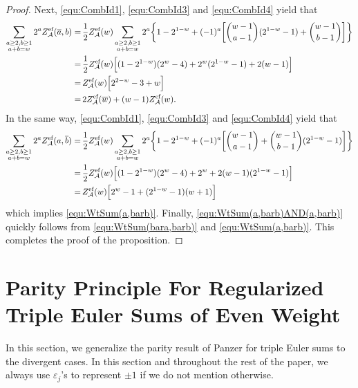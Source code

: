 \documentclass{article}
\newcommand\eps{{\varepsilon}}
\newcommand{\calA}{\mathcal{A}}
\newcommand{\eff}{\text{\rm{ef}}}
\newcommand{\ol}{\overline}
\theoremstyle{plain}
\theoremstyle{definition}
\begin{document}
\begin{proof}
Next,  \eqref{equ:CombId1}, \eqref{equ:CombId3} and  \eqref{equ:CombId4} yield that
\begin{align*}
  \sum_{\substack{a\ge 2,b\ge 1\\ a+b=w}} 2^a Z_\calA^\eff(\ol{a},b)
  =&\, \frac12 Z_\calA^\eff(w)\sum_{\substack{a\ge 2,b\ge 1\\ a+b=w}}   2^a \bigg\{1-2^{1-w}+(-1)^a \bigg[\binom{w-1}{a-1}(2^{1-w}-1)+\binom{w-1}{b-1}\bigg]\bigg\} \\
  =&\, \frac12 Z_\calA^\eff(w) \Big[(1-2^{1-w})(2^w-4)+2^w(2^{1-w}-1) +2(w-1)\Big]\\
  =&\,  Z_\calA^\eff(w) \Big[2^{2-w}-3+w\Big]\\
  =&\, 2Z_\calA^\eff(\ol{w}) + (w-1)Z_\calA^\eff(w).
\end{align*}
In the same way, \eqref{equ:CombId1}, \eqref{equ:CombId3} and  \eqref{equ:CombId4} yield that
\begin{align*}
  \sum_{\substack{a\ge 2,b\ge 1\\ a+b=w}} 2^a Z_\calA^\eff(a,\ol{b})
  =&\, \frac12 Z_\calA^\eff(w)\sum_{\substack{a\ge 2,b\ge 1\\ a+b=w}}   2^a\bigg\{1-2^{1-w} +(-1)^a \bigg[\binom{w-1}{a-1}+\binom{w-1}{b-1}(2^{1-w}-1)\bigg]\bigg\}\\
  =&\, \frac12 Z_\calA^\eff(w) \Big[(1-2^{1-w})(2^w-4)+2^{w}+ 2 (w-1)(2^{1-w}-1) \Big]\\
  =&\,  Z_\calA^\eff(w) \Big[2^w-1+(2^{1-w}-1) (w+1)\Big]
\end{align*}
which implies \eqref{equ:WtSum(a,barb)}. Finally, \eqref{equ:WtSum(a,barb)AND(a,barb)} quickly follows from \eqref{equ:WtSum(bara,barb)} and \eqref{equ:WtSum(a,barb)}. This completes the proof of the proposition.
\end{proof}



\section{Parity Principle For Regularized Triple Euler Sums of Even Weight}\label{sec:Parity}
In this section, we generalize the parity result of Panzer for triple Euler sums to the divergent cases. In this section and throughout the rest of the paper, we always use $\eps_j$'s to represent  $\pm 1$ if we do not mention otherwise.
\end{document}
